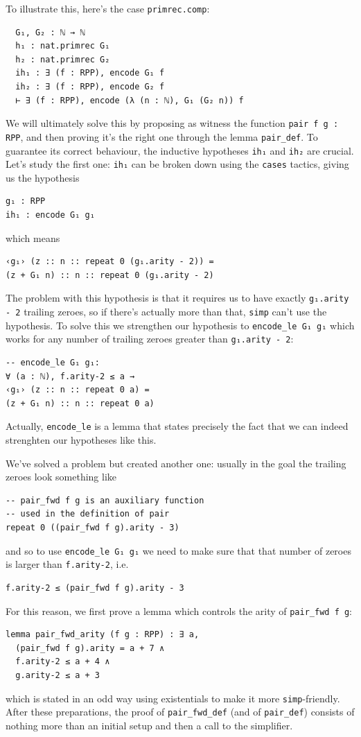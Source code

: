 \documentclass[oneside]{book}
\theoremstyle{definition}
\theoremstyle{remark}
\theoremstyle{plain}
\begin{document}
To illustrate this, here's the case \lstinline{primrec.comp}:
\begin{lstlisting}
  G₁, G₂ : ℕ → ℕ
  h₁ : nat.primrec G₁
  h₂ : nat.primrec G₂
  ih₁ : ∃ (f : RPP), encode G₁ f
  ih₂ : ∃ (f : RPP), encode G₂ f
  ⊢ ∃ (f : RPP), encode (λ (n : ℕ), G₁ (G₂ n)) f
\end{lstlisting}
We will ultimately solve this by proposing as witness the function \lstinline{pair f g : RPP},
and then proving it's the right one through the lemma \lstinline{pair_def}.
To guarantee its correct behaviour, the inductive hypotheses \lstinline{ih₁} and \lstinline{ih₂} are crucial.
Let's study the first one: \lstinline{ih₁} can be broken down using the \lstinline{cases} tactics,
giving us the hypothesis
\begin{lstlisting}
g₁ : RPP
ih₁ : encode G₁ g₁
\end{lstlisting}
which means
\begin{lstlisting}
‹g₁› (z :: n :: repeat 0 (g₁.arity - 2)) =
(z + G₁ n) :: n :: repeat 0 (g₁.arity - 2)
\end{lstlisting}
The problem with this hypothesis is that it requires us
to have exactly \lstinline{g₁.arity - 2} trailing zeroes,
so if there's actually more than that, \lstinline{simp} can't use the hypothesis.
To solve this we strengthen our hypothesis to \lstinline{encode_le G₁ g₁}
which works for any number of trailing zeroes greater than \lstinline{g₁.arity - 2}:
\begin{lstlisting}
-- encode_le G₁ g₁:
∀ (a : ℕ), f.arity-2 ≤ a →
‹g₁› (z :: n :: repeat 0 a) =
(z + G₁ n) :: n :: repeat 0 a)
\end{lstlisting}
Actually, \lstinline{encode_le} is a lemma that states precisely
the fact that we can indeed strenghten our hypotheses like this.

We've solved a problem but created another one:
usually in the goal the trailing zeroes look something like
\begin{lstlisting}
-- pair_fwd f g is an auxiliary function
-- used in the definition of pair 
repeat 0 ((pair_fwd f g).arity - 3)
\end{lstlisting}
and so to use \lstinline{encode_le G₁ g₁} we need to make sure that
that number of zeroes is larger than \lstinline{f.arity-2}, i.e.
\begin{lstlisting}
f.arity-2 ≤ (pair_fwd f g).arity - 3
\end{lstlisting}
For this reason, we first prove a lemma which controls
the arity of \lstinline{pair_fwd f g}:
\begin{lstlisting}
lemma pair_fwd_arity (f g : RPP) : ∃ a,
  (pair_fwd f g).arity = a + 7 ∧
  f.arity-2 ≤ a + 4 ∧
  g.arity-2 ≤ a + 3
\end{lstlisting}
which is stated in an odd way using existentials to make it more \lstinline{simp}-friendly.
After these preparations, the proof of \lstinline{pair_fwd_def}
(and of \lstinline{pair_def}) consists of nothing more than
an initial setup and then a call to the simplifier.
\end{document}
